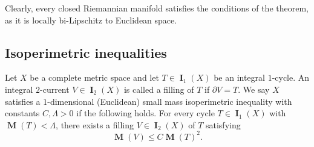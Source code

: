 \documentclass{amsart}
\numberwithin{equation}{section}
\DeclareMathOperator{\bI}{\mathbf{I}}
\DeclareMathOperator{\bM}{\mathbf{M}}
\begin{document}
        Clearly, every closed Riemannian manifold satisfies the conditions of the theorem, as it is locally bi-Lipschitz to Euclidean space.  


    \subsection{Isoperimetric inequalities}\label{see: isoper}
        Let $X$ be a complete metric space and let $T \in \bI_1(X)$ be an integral $1$-cycle. An integral $2$-current $V\in \bI_{2}(X)$ is called a filling of $T$ if $\partial V = T$. We say $X$ satisfies a $1$-dimensional (Euclidean) small mass isoperimetric inequality with constants $C, \Lambda>0$ if the following holds. For every cycle $T \in \bI_{1}(X)$ with $\bM(T) < \Lambda$, there exists a filling $V \in \bI_{2}(X)$ of $T$ satisfying $$\bM(V) \leq C  \bM(T)^2.$$

        \medskip
\end{document}
